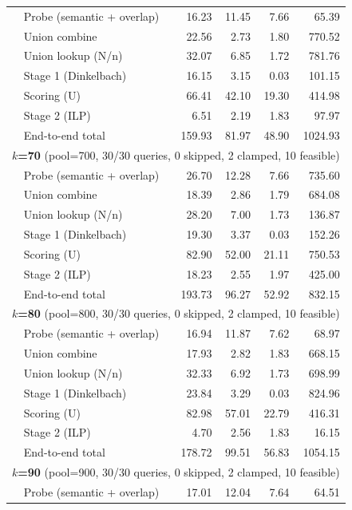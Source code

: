 \begin{longtable}{llrrrr}
 & Probe (semantic + overlap) & 16.23 & 11.45 & 7.66 & 65.39 \\
 & Union combine & 22.56 & 2.73 & 1.80 & 770.52 \\
 & Union lookup (N/n) & 32.07 & 6.85 & 1.72 & 781.76 \\
 & Stage 1 (Dinkelbach)\tnote{b} & 16.15 & 3.15 & 0.03 & 101.15 \\
 & Scoring (U) & 66.41 & 42.10 & 19.30 & 414.98 \\
 & Stage 2 (ILP)\tnote{b} & 6.51 & 2.19 & 1.83 & 97.97 \\
 & End-to-end total & 159.93 & 81.97 & 48.90 & 1024.93 \\
\midrule
\multicolumn{6}{l}{\textbf{$k$=70} (pool=700, 30/30 queries, 0 skipped, 2 clamped, 10 feasible)\tnote{a}} \\
 & Probe (semantic + overlap) & 26.70 & 12.28 & 7.66 & 735.60 \\
 & Union combine & 18.39 & 2.86 & 1.79 & 684.08 \\
 & Union lookup (N/n) & 28.20 & 7.00 & 1.73 & 136.87 \\
 & Stage 1 (Dinkelbach)\tnote{b} & 19.30 & 3.37 & 0.03 & 152.26 \\
 & Scoring (U) & 82.90 & 52.00 & 21.11 & 750.53 \\
 & Stage 2 (ILP)\tnote{b} & 18.23 & 2.55 & 1.97 & 425.00 \\
 & End-to-end total & 193.73 & 96.27 & 52.92 & 832.15 \\
\midrule
\multicolumn{6}{l}{\textbf{$k$=80} (pool=800, 30/30 queries, 0 skipped, 2 clamped, 10 feasible)\tnote{a}} \\
 & Probe (semantic + overlap) & 16.94 & 11.87 & 7.62 & 68.97 \\
 & Union combine & 17.93 & 2.82 & 1.83 & 668.15 \\
 & Union lookup (N/n) & 32.33 & 6.92 & 1.73 & 698.99 \\
 & Stage 1 (Dinkelbach)\tnote{b} & 23.84 & 3.29 & 0.03 & 824.96 \\
 & Scoring (U) & 82.98 & 57.01 & 22.79 & 416.31 \\
 & Stage 2 (ILP)\tnote{b} & 4.70 & 2.56 & 1.83 & 16.15 \\
 & End-to-end total & 178.72 & 99.51 & 56.83 & 1054.15 \\
\midrule
\multicolumn{6}{l}{\textbf{$k$=90} (pool=900, 30/30 queries, 0 skipped, 2 clamped, 10 feasible)\tnote{a}} \\
 & Probe (semantic + overlap) & 17.01 & 12.04 & 7.64 & 64.51 \\

\end{longtable}
